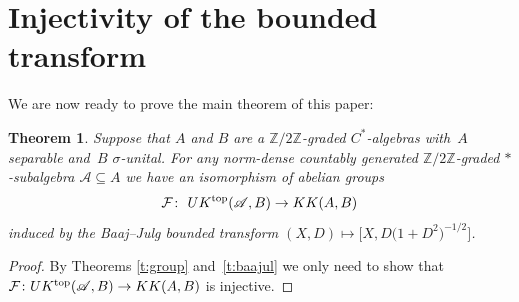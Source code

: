 \documentclass[pdftex]{sigma}
\numberwithin{equation}{section}
\newtheorem{Theorem}{Theorem}[section]
\newcommand{\zz}{\mathbb{Z}}
\newcommand{\si}{\sigma}
\newcommand{\C}[1]{\mathcal{#1}}
\newcommand{\s}[1]{\mathscr{#1}}
\newcommand{\su}{\subseteq}
\begin{document}
\section{Injectivity of the bounded transform}\label{s:injbou}
We are now ready to prove the main theorem of this paper:

\begin{Theorem}\label{t:isobaajul}
Suppose that $A$ and $B$ are a $\zz/2\zz$-graded $C^*$-algebras with~$A$ separable and~$B$ $\si$-unital. For any norm-dense countably generated $\zz/2\zz$-graded $*$-subalgebra $\s A \su A$ we have an isomorphism of abelian groups
\[
\C F\colon \ UK^{{\rm top}}(\s A, B) \to KK(A,B)
\]
induced by the Baaj--Julg bounded transform $(X,D) \mapsto \big[X, D\big(1 + D^2\big)^{-1/2}\big]$.
\end{Theorem}
\begin{proof}
By Theorems \ref{t:group} and~\ref{t:baajul} we only need to show that $\C F\colon UK^{{\rm top}}(\s A,B) \to KK(A,B)$ is injective.


\end{proof}
\end{document}
